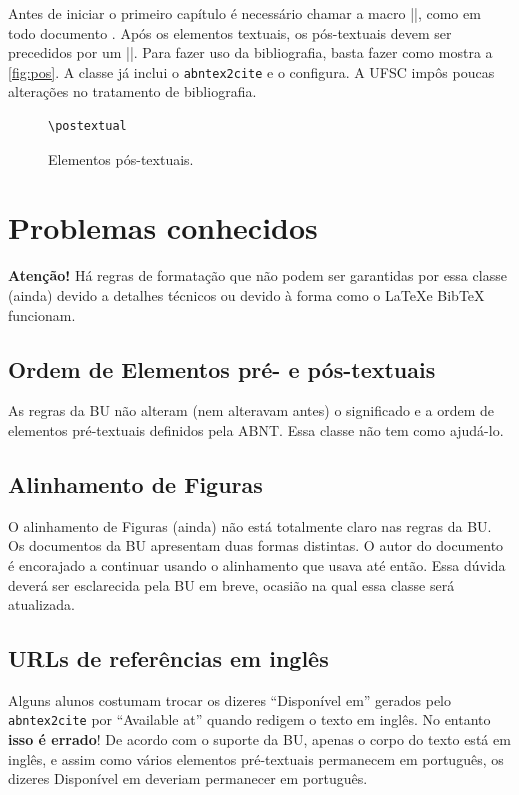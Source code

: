 \documentclass[embeddedlogo]{../ufsc-thesis-rn46-2019}
\begin{document}
Antes de iniciar o primeiro capítulo é necessário chamar a macro \mt|\textual|,
como em todo documento \abnTeX. Após os elementos textuais, os pós-textuais
devem ser precedidos por um \mt|\postextual|. Para fazer uso da bibliografia,
basta fazer como mostra a \autoref{fig:pos}. A classe já inclui o
\texttt{abntex2cite} e o configura. A UFSC impôs poucas alterações no
tratamento de bibliografia.

\begin{figure}[tb]
  \centering
  \caption{Elementos pós-textuais.}
  \label{fig:pos}
  \begin{verbatim}
\postextual

  \end{verbatim}
\end{figure}


\chapter{Problemas conhecidos}
\label{ch:problems}

\textbf{Atenção!} Há regras de formatação que não podem ser garantidas por essa
classe (ainda) devido a detalhes técnicos ou devido à forma como o \LaTeX e
BibTeX funcionam.

\section{Ordem de Elementos pré- e pós-textuais}
As regras da BU não alteram (nem alteravam antes) o significado e a ordem de
elementos pré-textuais definidos pela ABNT. Essa classe não tem como ajudá-lo.

\section{Alinhamento de Figuras}
O alinhamento de Figuras (ainda) não está totalmente claro nas regras da BU. Os
documentos da BU apresentam duas formas distintas. O autor do documento é
encorajado a continuar usando o alinhamento que usava até então. Essa dúvida
deverá ser esclarecida pela BU em breve, ocasião na qual essa classe será
atualizada.

\section{URLs de referências em inglês}

Alguns alunos costumam trocar os dizeres ``Disponível em'' gerados pelo
\texttt{abntex2cite} por ``Available at'' quando redigem o texto em inglês. No
entanto \textbf{isso é errado}! De acordo com o suporte da BU, apenas o corpo do
texto está em inglês, e assim como vários elementos pré-textuais permanecem em
português, os dizeres Disponível em deveriam permanecer em português.
\end{document}
